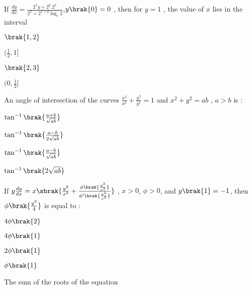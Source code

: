 \item %
If $\frac{dy}{dx}= \frac{2^xy+2^y.2^x}{2^x+2^{x+y}\log_e 2}$,$y\brak{0} = 0$ , then for $y=1$ , the value of $x$ lies in the interval 
\begin{enumerate}
\begin{multicols}{2}
\item $\brak{1,2}$
\item $(\frac{1}{2},1]$
\end{multicols}
\begin{multicols}{2}
\item $\brak{2,3}$
\item $(0,\frac{1}{2}]$
\end{multicols}
\end{enumerate}
\item %
An angle of intersection of the curves $\frac{x^2}{a^2}+\frac{y^2}{b^2}=1$ and $x^2+y^2=ab$ , $a > b$ is :
\begin{enumerate}
\begin{multicols}{2}
\item $\tan^{-1}{\brak{\frac{a+b}{\sqrt{ab}}}}$
\item $\tan^{-1}{\brak{\frac{a-b}{2\sqrt{ab}}}}$
\end{multicols}
\begin{multicols}{2}
\item $\tan^{-1}{\brak{\frac{a-b}{\sqrt{ab}}}}$
\item $\tan^{-1}{\brak{2\sqrt{ab}}}$
\end{multicols}
\end{enumerate}
\item %
If $y\frac{dy}{dx}=x\sbrak{\frac{y^2}{x^2}+\frac{\phi\brak{\frac{y^2}{x^2}}}{\phi'\brak{\frac{y^2}{x^2}}}}$ , $x>0$, $\phi >0$, and $y\brak{1}=-1$, then $\phi\brak{\frac{y^2}{4}}$ is equal to :
\begin{enumerate}
\begin{multicols}{2}
\item $4\phi \brak{2}$
\item $4\phi \brak{1}$
\end{multicols}
\begin{multicols}{2}
\item $2\phi \brak{1}$
\item $\phi \brak{1}$
\end{multicols}
\end{enumerate}
\item %
The sum of the roots of the equation \\ 
